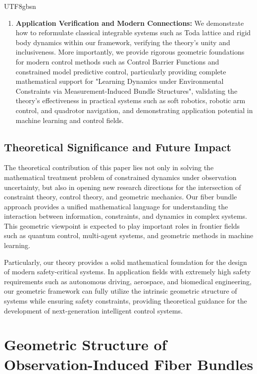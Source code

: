 \documentclass[a4paper,12pt]{extarticle}
\theoremstyle{definition}
\begin{document}
\begin{CJK}{UTF8}{gbsn}
\begin{enumerate}
\item \textbf{Application Verification and Modern Connections:} We demonstrate how to reformulate classical integrable systems such as Toda lattice and rigid body dynamics within our framework, verifying the theory's unity and inclusiveness. More importantly, we provide rigorous geometric foundations for modern control methods such as Control Barrier Functions\cite{ames2019control} and constrained model predictive control\cite{rawlings2017model}, particularly providing complete mathematical support for "Learning Dynamics under Environmental Constraints via Measurement-Induced Bundle Structures"\cite{zheng2025learning}, validating the theory's effectiveness in practical systems such as soft robotics, robotic arm control, and quadrotor navigation, and demonstrating application potential in machine learning and control fields.
\end{enumerate}

\subsection{Theoretical Significance and Future Impact}

The theoretical contribution of this paper lies not only in solving the mathematical treatment problem of constrained dynamics under observation uncertainty, but also in opening new research directions for the intersection of constraint theory, control theory, and geometric mechanics. Our fiber bundle approach provides a unified mathematical language for understanding the interaction between information, constraints, and dynamics in complex systems. This geometric viewpoint is expected to play important roles in frontier fields such as quantum control\cite{nielsen2000quantum}, multi-agent systems\cite{olfati2007consensus}, and geometric methods in machine learning\cite{amari2016information}.

Particularly, our theory provides a solid mathematical foundation for the design of modern safety-critical systems. In application fields with extremely high safety requirements such as autonomous driving\cite{paden2016survey}, aerospace\cite{stevens2015aircraft}, and biomedical engineering\cite{bronzino2000biomedical}, our geometric framework can fully utilize the intrinsic geometric structure of systems while ensuring safety constraints, providing theoretical guidance for the development of next-generation intelligent control systems.

\section{Geometric Structure of Observation-Induced Fiber Bundles}


\end{CJK}
\end{document}
